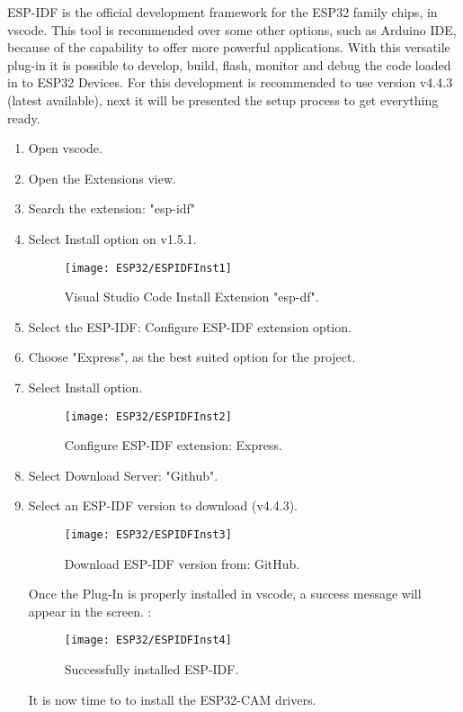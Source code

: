 ESP-IDF is the official development framework for the ESP32 family chips, in \ac{vscode}. This tool is recommended over some other options, such as Arduino IDE, because of the capability to offer more powerful applications. With this versatile plug-in it is possible to develop, build, flash, monitor and debug the code loaded in to ESP32 Devices. For this development is recommended to use version v4.4.3 (latest available), next it will be presented the setup process to get everything ready.

\begin{enumerate}
    \item Open \ac{vscode}.
    \item Open the Extensions view.
    \item Search the extension: "esp-idf"
    \item Select Install option on v1.5.1.
    \begin{figure}  [H]
        \begin{center}
            \texttt{[image: ESP32/ESPIDFInst1]}
            \caption{Visual Studio Code Install Extension "esp-df".} 
            \label{fig:Visual Studio Code Install Extension "esp-df".}
        \end{center}
    \end{figure}
    \item Select the ESP-IDF: Configure ESP-IDF extension option.
    \item Choose "Express", as the best suited option for the project.
    \item Select Install option.
    \begin{figure}  [H]
        \begin{center}
            \texttt{[image: ESP32/ESPIDFInst2]}
            \caption{Configure ESP-IDF extension: Express.} 
            \label{fig:Configure ESP-IDF extension: Express.}
        \end{center}
    \end{figure}
    \item Select Download Server: "Github".	
    \item Select an ESP-IDF version to download (v4.4.3).
    \begin{figure}  [H]
        \begin{center}
            \texttt{[image: ESP32/ESPIDFInst3]}
            \caption{Download ESP-IDF version from: GitHub.} 
            \label{fig:Download ESP-IDF version from: GitHub.}
        \end{center}
    \end{figure}	
    Once the Plug-In is properly installed in \ac{vscode}, a success message will appear in the screen. \cite{Ignacio:2022}:
    \begin{figure}  [H]
        \begin{center}
            \texttt{[image: ESP32/ESPIDFInst4]}
            \caption{Successfully installed ESP-IDF.} 
            \label{fig:Successfully installed ESP-IDF.}
        \end{center}
    \end{figure}	
    It is now time to to install the ESP32-CAM drivers. 
    

\end{enumerate}
